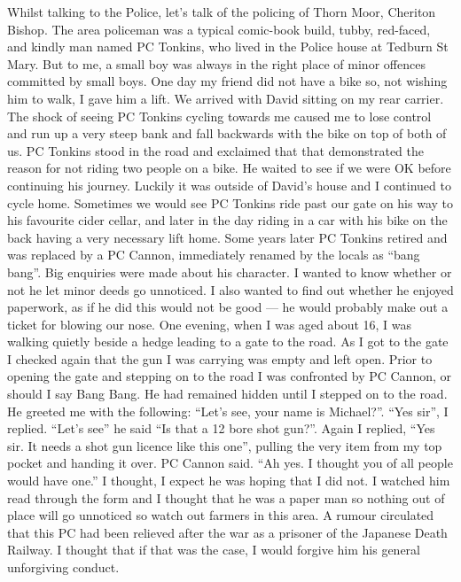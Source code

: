 Whilst talking to the Police, let's talk of the policing of Thorn Moor, Cheriton
Bishop. The area policeman was a typical comic-book build, tubby, red-faced,
and kindly man named PC Tonkins, who lived in the Police house at Tedburn St
Mary. But to me, a small boy was always in the right place of minor offences
committed by small boys. One day my friend did not have a bike so, not wishing
him to walk, I gave him a lift. We arrived with David sitting on my rear
carrier. The shock of seeing PC Tonkins cycling towards me caused me to lose
control and run up a very steep bank and fall backwards with the bike on top of
both of us. PC Tonkins stood in the road and exclaimed that that demonstrated
the reason for not riding two people on a bike. He waited to see if we were OK
before continuing his journey. Luckily it was outside of David's house and I
continued to cycle home. Sometimes we would see PC Tonkins ride past our gate
on his way to his favourite cider cellar, and later in the day riding in a car
with his bike on the back having a very necessary lift home. Some years later
PC Tonkins retired and was replaced by a PC Cannon, immediately renamed by the
locals as ``bang bang''. Big enquiries were made about his character. I wanted
to know whether or not he let minor deeds go unnoticed. I also wanted to find
out whether he enjoyed paperwork, as if he did this would not be good --- he
would probably make out a ticket for blowing our nose. One evening, when I was
aged about 16, I was walking quietly beside a hedge leading to a gate to the
road. As I got to the gate I checked again that the gun I was carrying was
empty and left open. Prior to opening the gate and stepping on to the road I
was confronted by PC Cannon, or should I say Bang Bang. He had remained hidden
until I stepped on to the road. He greeted me with the following: ``Let's see,
your name is Michael?''. ``Yes sir'', I replied. ``Let's see'' he said ``Is
that a 12 bore shot gun?''. Again I replied, ``Yes sir. It needs a shot gun
licence like this one'', pulling the very item from my top pocket and handing
it over. PC Cannon said. ``Ah yes. I thought you of all people would have
one.'' I thought, I expect he was hoping that I did not. I watched him read
through the form and I thought that he was a paper man so nothing out of place
will go unnoticed so watch out farmers in this area. A rumour circulated that
this PC had been relieved after the war as a prisoner of the Japanese Death
Railway. I thought that if that was the case, I would forgive him his general
unforgiving conduct.

